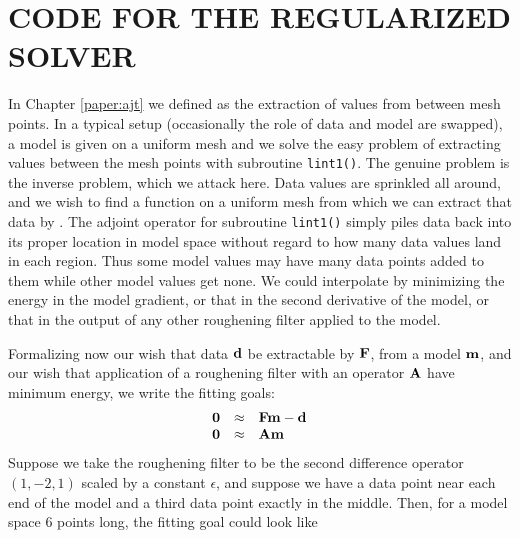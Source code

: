 \section{CODE FOR THE REGULARIZED SOLVER}
In Chapter \ref{paper:ajt} we defined 
as the extraction of values from between mesh points.
In a typical setup (occasionally the role of data and model are swapped),
a model is given on a uniform mesh
and we solve the easy problem of extracting values
between the mesh points with subroutine \texttt{lint1()}.
The genuine problem is the inverse problem, which we attack here.
Data values are sprinkled all around,
and we wish to find a function on a uniform mesh
from which we can extract that data by .
The adjoint operator for subroutine {\tt lint1()}
simply piles data back into its proper location in model space
without regard to how many data values land in each region.
Thus some model values may have many data points added
to them while other model values get none.
We could interpolate by minimizing the energy in the model gradient,
or that in the second derivative of the model,
or that in the output of any other roughening filter
applied to the model.
\par
Formalizing now our wish
that data $\bold d$ be extractable by  $\bold F$,
from a model $\bold m$,
and our wish that application of a roughening filter
with an operator $\bold A$ have minimum energy, we write the fitting goals:
\begin{equation}
        \begin{array}{lll}
        \bold 0 &\approx & \bold F \bold m - \bold d \\
        \bold 0 &\approx & \bold A \bold m
        \label{eqn:invintwish}
        \end{array}
\end{equation}
Suppose we take the roughening filter to be the second difference operator
$(1,-2,1)$
scaled by a constant $\epsilon$,
and suppose we have a data point near each end of the model
and a third data point exactly in the middle.
Then,
for a model space 6 points long,
the fitting goal could look like
\def\E{\epsilon}
